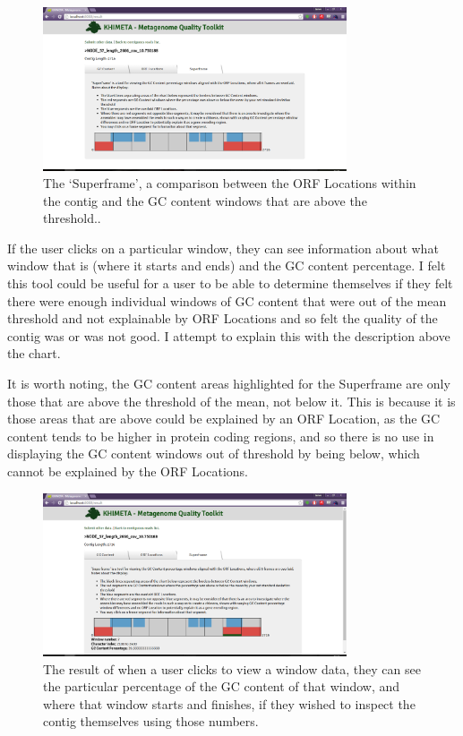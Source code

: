 \begin{figure}[H]
	\centering
\includegraphics[width=0.8\textwidth]{images/ui8}
\caption{The `Superframe', a comparison between the ORF Locations within the contig and the GC content windows that are above the threshold..}
\end{figure}

If the user clicks on a particular window, they can see information about what window that is (where it starts and ends) and the GC content percentage. I felt this tool could be useful for a user to be able to determine themselves if they felt there were enough individual windows of GC content that were out of the mean threshold and not explainable by ORF Locations and so felt the quality of the contig was or was not good. I attempt to explain this with the description above the chart.

It is worth noting, the GC content areas highlighted for the Superframe are only those that are above the threshold of the mean, not below it. This is because it is those areas that are above could be explained by an ORF Location, as the GC content tends to be higher in protein coding regions, and so there is no use in displaying the GC content windows out of threshold by being below, which cannot be explained by the ORF Locations.

\begin{figure}[H]
	\centering
\includegraphics[width=0.8\textwidth]{images/ui9}
\caption{The result of when a user clicks to view a window data, they can see the particular percentage of the GC content of that window, and where that window starts and finishes, if they wished to inspect the contig themselves using those numbers.}
\end{figure}

